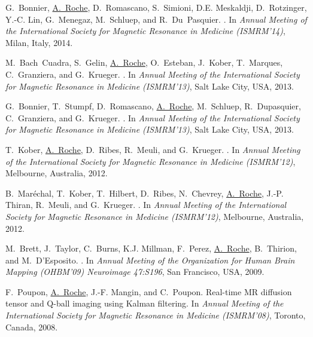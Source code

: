 \begin{thebibliography}{100}
G.~Bonnier, \underline{A.~Roche}, D.~Romascano, S.~Simioni, D.E. Meskaldji, D.~Rotzinger,
  Y.-C. Lin, G.~Menegaz, M.~Schluep, and R.~Du~Pasquier.
.
\newblock In {\em Annual Meeting of the International Society for Magnetic
  Resonance in Medicine (ISMRM'14)}, Milan, Italy, 2014.

M.~Bach~Cuadra, S.~Gelin, \underline{A.~Roche}, O.~Esteban, J.~Kober, T.~Marques,
  C.~Granziera, and G.~Krueger.
.
\newblock In {\em Annual Meeting of the International Society for Magnetic
  Resonance in Medicine (ISMRM'13)}, Salt Lake City, USA, 2013.

G.~Bonnier, T.~Stumpf, D.~Romascano, \underline{A.~Roche}, M.~Schluep, R.~Dupasquier,
  C.~Granziera, and G.~Krueger.
.
\newblock In {\em Annual Meeting of the International Society for Magnetic
  Resonance in Medicine (ISMRM'13)}, Salt Lake City, USA, 2013.

T.~Kober, \underline{A.~Roche}, D.~Ribes, R.~Meuli, and G.~Krueger.
.
\newblock In {\em Annual Meeting of the International Society for Magnetic
  Resonance in Medicine (ISMRM'12)}, Melbourne, Australia, 2012.

B.~Mar\'echal, T.~Kober, T.~Hilbert, D.~Ribes, N.~Chevrey, \underline{A.~Roche}, J.-P.
  Thiran, R.~Meuli, and G.~Krueger.
.
\newblock In {\em Annual Meeting of the International Society for Magnetic
  Resonance in Medicine (ISMRM'12)}, Melbourne, Australia, 2012.

M.~Brett, J.~Taylor, C.~Burns, K.J. Millman, F.~Perez, \underline{A.~Roche}, B.~Thirion,
  and M.~D'Esposito.
.
\newblock In {\em Annual Meeting of the Organization for Human Brain Mapping
  (OHBM'09) Neuroimage 47:S196}, San Francisco, USA, 2009.

F.~Poupon, \underline{A.~Roche}, J.-F. Mangin, and C.~Poupon.
\newblock Real-time {MR} diffusion tensor and {Q-ball} imaging using {Kalman}
  filtering.
\newblock In {\em Annual Meeting of the International Society for Magnetic
  Resonance in Medicine (ISMRM'08)}, Toronto, Canada, 2008.


\end{thebibliography}
